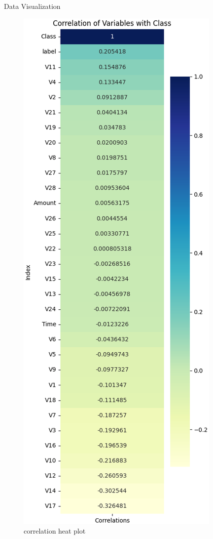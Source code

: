 \documentclass[
 size=14pt,
 paper=smartboard,  %
 mode=present, 		%
 display=slides, 	%
 style=tuliplab,  	%
 pauseslide,
 fleqn,leqno]{powerdot}
\begin{document}
\begin{slide}{Data Visualization}
	
	
	\begin{figure}[H]
		\centering
		\includegraphics[height=0.6\textheight]{figures/correlation.eps}
		\caption{correlation heat plot}
		\label{fig:correlation}
	\end{figure}
	
\end{slide}
\end{document}
